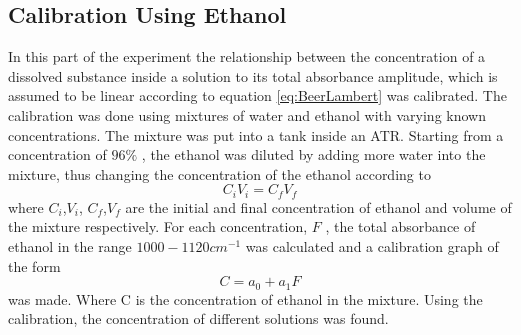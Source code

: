 \documentclass[reprint,amsmath,amssymb,aps, prl]{revtex4-2}
\begin{document}
\subsection{Calibration Using Ethanol} 
In this part of the experiment the relationship between the concentration of a dissolved substance inside a solution to its total absorbance amplitude, which is assumed to be linear according to equation \ref{eq:BeerLambert} was calibrated. The calibration was done using mixtures of water and ethanol  with varying known concentrations. The mixture was put into a tank inside an ATR. Starting from a concentration of $96\%$ , the ethanol was diluted by adding more water into the mixture, thus changing the concentration of the ethanol according to 
\begin{equation} \label{eq:EthanolConcentrVolume}
C_{i}V_{i} = C_{f}V_{f}
\end{equation}
where $C_{i}$,$V_{i}$, $C_{f}$,$V_{f}$ are the initial and final concentration of ethanol and volume of the mixture respectively. 
For each concentration, $F$ , the total absorbance of ethanol in the range $1000-1120 cm^{-1}$ was calculated and a calibration graph of the form 
\begin{equation} \label{eq:EthanolLinFit}
    C=a_{0}+a_{1}F 
\end{equation} 
was made. Where C is the concentration of ethanol in the mixture. Using the calibration, the concentration of different solutions was found. 
\end{document}
